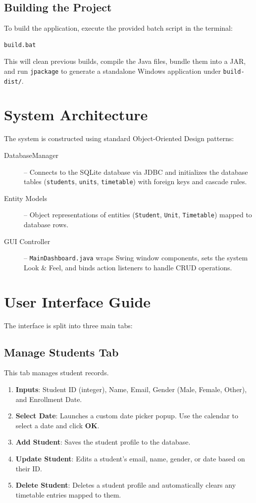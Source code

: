 \documentclass[11pt,a4paper]{article}
\begin{document}
\subsection{Building the Project}
To build the application, execute the provided batch script in the terminal:
\begin{lstlisting}[language=bash]
build.bat
\end{lstlisting}
This will clean previous builds, compile the Java files, bundle them into a JAR, and run \texttt{jpackage} to generate a standalone Windows application under \texttt{build-dist/}.

\section{System Architecture}
The system is constructed using standard Object-Oriented Design patterns:
\begin{description}
    \item[DatabaseManager] -- Connects to the SQLite database via JDBC and initializes the database tables (\texttt{students}, \texttt{units}, \texttt{timetable}) with foreign keys and cascade rules.
    \item[Entity Models] -- Object representations of entities (\texttt{Student}, \texttt{Unit}, \texttt{Timetable}) mapped to database rows.
    \item[GUI Controller] -- \texttt{MainDashboard.java} wraps Swing window components, sets the system Look \& Feel, and binds action listeners to handle CRUD operations.
\end{description}

\section{User Interface Guide}
The interface is split into three main tabs:

\subsection{Manage Students Tab}
This tab manages student records.
\begin{enumerate}
    \item \textbf{Inputs}: Student ID (integer), Name, Email, Gender (Male, Female, Other), and Enrollment Date.
    \item \textbf{Select Date}: Launches a custom date picker popup. Use the calendar to select a date and click \textbf{OK}.
    \item \textbf{Add Student}: Saves the student profile to the database.
    \item \textbf{Update Student}: Edits a student's email, name, gender, or date based on their ID.
    \item \textbf{Delete Student}: Deletes a student profile and automatically clears any timetable entries mapped to them.
\end{enumerate}
\end{document}
